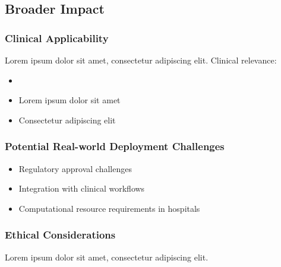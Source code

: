 \subsection{Broader Impact}
\subsubsection{Clinical Applicability}
Lorem ipsum dolor sit amet, consectetur adipiscing elit. Clinical relevance:
\begin{itemize}
    \item {}
    \item Lorem ipsum dolor sit amet
    \item Consectetur adipiscing elit
\end{itemize}

\subsubsection{Potential Real-world Deployment Challenges}
\begin{itemize}
    \item Regulatory approval challenges
    \item Integration with clinical workflows
    \item Computational resource requirements in hospitals
\end{itemize}

\subsubsection{Ethical Considerations}
Lorem ipsum dolor sit amet, consectetur adipiscing elit. 